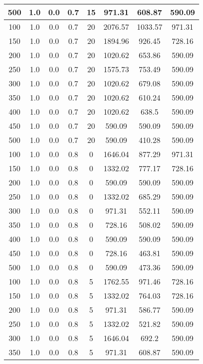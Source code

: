 \documentclass[a4paper, 12pt]{extreport}
\begin{document}
\begin{itemize}
\begin{longtable}{|c|c|c|c|c|c|c|c|}
			500 & 1.0 & 0.0 & 0.7 & 15 & 971.31 & 608.87 & 590.09 \\\hline
			100 & 1.0 & 0.0 & 0.7 & 20 & 2076.57 & 1033.57 & 971.31 \\\hline
			150 & 1.0 & 0.0 & 0.7 & 20 & 1894.96 & 926.45 & 728.16 \\\hline
			200 & 1.0 & 0.0 & 0.7 & 20 & 1020.62 & 653.86 & 590.09 \\\hline
			250 & 1.0 & 0.0 & 0.7 & 20 & 1575.73 & 753.49 & 590.09 \\\hline
			300 & 1.0 & 0.0 & 0.7 & 20 & 1020.62 & 679.08 & 590.09 \\\hline
			350 & 1.0 & 0.0 & 0.7 & 20 & 1020.62 & 610.24 & 590.09 \\\hline
			400 & 1.0 & 0.0 & 0.7 & 20 & 1020.62 & 638.5 & 590.09 \\\hline
			450 & 1.0 & 0.0 & 0.7 & 20 & 590.09 & 590.09 & 590.09 \\\hline
			500 & 1.0 & 0.0 & 0.7 & 20 & 590.09 & 410.28 & 590.09 \\\hline
			100 & 1.0 & 0.0 & 0.8 & 0 & 1646.04 & 877.29 & 971.31 \\\hline
			150 & 1.0 & 0.0 & 0.8 & 0 & 1332.02 & 777.17 & 728.16 \\\hline
			200 & 1.0 & 0.0 & 0.8 & 0 & 590.09 & 590.09 & 590.09 \\\hline
			250 & 1.0 & 0.0 & 0.8 & 0 & 1332.02 & 685.29 & 590.09 \\\hline
			300 & 1.0 & 0.0 & 0.8 & 0 & 971.31 & 552.11 & 590.09 \\\hline
			350 & 1.0 & 0.0 & 0.8 & 0 & 728.16 & 508.02 & 590.09 \\\hline
			400 & 1.0 & 0.0 & 0.8 & 0 & 590.09 & 590.09 & 590.09 \\\hline
			450 & 1.0 & 0.0 & 0.8 & 0 & 728.16 & 463.81 & 590.09 \\\hline
			500 & 1.0 & 0.0 & 0.8 & 0 & 590.09 & 473.36 & 590.09 \\\hline
			100 & 1.0 & 0.0 & 0.8 & 5 & 1762.55 & 971.46 & 728.16 \\\hline
			150 & 1.0 & 0.0 & 0.8 & 5 & 1332.02 & 764.03 & 728.16 \\\hline
			200 & 1.0 & 0.0 & 0.8 & 5 & 971.31 & 586.77 & 590.09 \\\hline
			250 & 1.0 & 0.0 & 0.8 & 5 & 1332.02 & 521.82 & 590.09 \\\hline
			300 & 1.0 & 0.0 & 0.8 & 5 & 1646.04 & 692.2 & 590.09 \\\hline
			350 & 1.0 & 0.0 & 0.8 & 5 & 971.31 & 608.87 & 590.09 \\\hline

\end{longtable}
\end{itemize}
\end{document}
